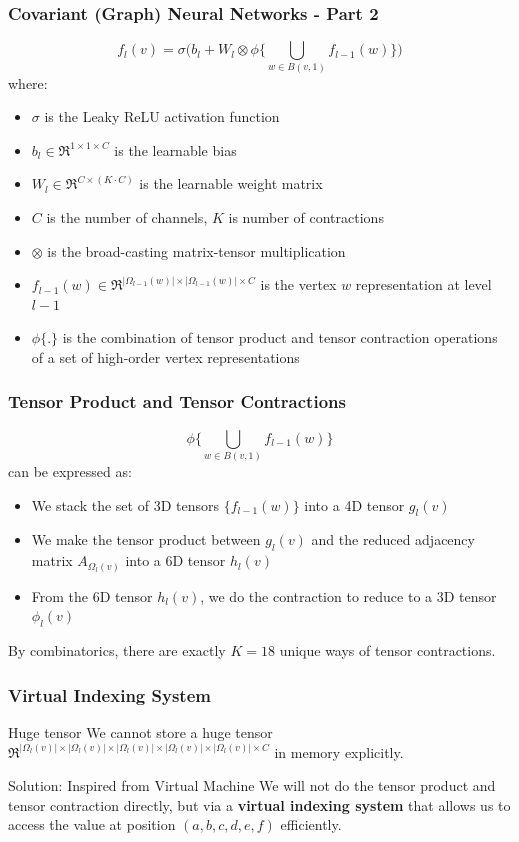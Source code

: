 \documentclass{beamer}
\begin{document}
\begin{frame}
\frametitle{Covariant (Graph) Neural Networks - Part 2}
$$f_l(v) = \sigma \bigg( b_l + W_l \otimes \phi \bigg\{ \bigcup\limits_{w \in B(v, 1)} f_{l - 1}(w) \bigg\} \bigg)$$
where:
\begin{itemize}
	\item $\sigma$ is the Leaky ReLU activation function
	\item $b_l \in \Re^{1 \times 1 \times C}$ is the learnable bias
	\item $W_l \in \Re^{C \times (K \cdot C)}$ is the learnable weight matrix
	\item $C$ is the number of channels, $K$ is number of contractions
	\item $\otimes$ is the broad-casting matrix-tensor multiplication
	\item $f_{l - 1}(w) \in \Re^{|\Omega_{l - 1}(w)| \times |\Omega_{l - 1}(w)| \times C}$ is the vertex $w$ representation at level $l - 1$
	\item $\phi\{.\}$ is the combination of tensor product and tensor contraction operations of a set of high-order vertex representations
\end{itemize}
\end{frame}

\begin{frame}
\frametitle{Tensor Product and Tensor Contractions}
$$\phi \bigg\{ \bigcup\limits_{w \in B(v, 1)} f_{l - 1}(w) \bigg\}$$
can be expressed as:
\begin{itemize}
	\item We stack the set of 3D tensors $\{f_{l - 1}(w)\}$ into a 4D tensor $g_l(v)$
	\item We make the tensor product between $g_l(v)$ and the reduced adjacency matrix $A_{\Omega_l(v)}$ into a 6D tensor $h_l(v)$
	\item From the 6D tensor $h_l(v)$, we do the contraction to reduce to a 3D tensor $\phi_l(v)$
\end{itemize}
By combinatorics, there are exactly $K = 18$ unique ways of tensor contractions.
\end{frame}

\begin{frame}
\frametitle{Virtual Indexing System}
\begin{alertblock}{Huge tensor}
We cannot store a huge tensor $\Re^{|\Omega_l(v)| \times |\Omega_l(v)| \times |\Omega_l(v)| \times |\Omega_l(v)| \times |\Omega_l(v)| \times C}$ in memory explicitly.
\end{alertblock}
\begin{block}{Solution: Inspired from Virtual Machine}
We will not do the tensor product and tensor contraction directly, but via a \textbf{virtual indexing system} that allows us to access the value at position $(a, b, c, d, e, f)$ efficiently.
\end{block}
\end{frame}
\end{document}
